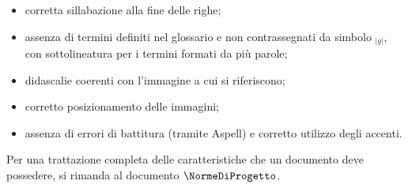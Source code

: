{{{\begin{itemize}
\begin{itemize}
				\item corretta sillabazione alla fine delle righe;
				\item assenza di termini definiti nel glossario e non contrassegnati da simbolo $_{|g|}$, con sottolineatura per i termini formati da più parole;
				\item didascalie coerenti con l'immagine a cui si riferiscono;
				\item corretto posizionamento delle immagini;
				\item assenza di errori di battitura (tramite Aspell) e corretto utilizzo degli accenti.
			    \end{itemize}
			    Per una trattazione completa delle caratteristiche che un documento deve possedere, si rimanda al documento $\NormeDiProgetto$.
		\end{itemize}
	}

}}
